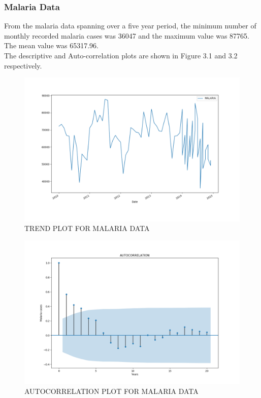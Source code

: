 \documentclass[12pt, letterpaper, twoside]{article}
\begin{document}
\subsubsection{Malaria Data}
From the malaria data spanning over a five year period, the minimum number of monthly recorded malaria cases was 36047 and the maximum value was 87765. The mean value was 65317.96. \\ The descriptive and Auto-correlation plots are shown in Figure 3.1 and 3.2 respectively. 
\begin{figure}[bp!]
	    \centering
		\includegraphics[width=1\textwidth]{Malaria_Trend_plot.png}
		    \caption{TREND PLOT FOR MALARIA DATA}
		        \label{fig:3.1}
\end{figure}

\begin{figure}[bp!]
	    \centering                                                                                                                                                                  \includegraphics[width=1\textwidth]{MALARIA_DATA_ACF_PLOT.png}
		    \caption{AUTOCORRELATION PLOT FOR MALARIA DATA}
		       \label{fig:3.2}
\end{figure}
\end{document}
